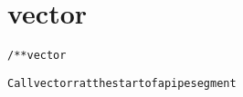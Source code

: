 \section{vector}
\begin{shaded}
\begin{alltt}
/** vector

  Call vectorr at the start of a pipe segment

\end{alltt}
\end{shaded}
